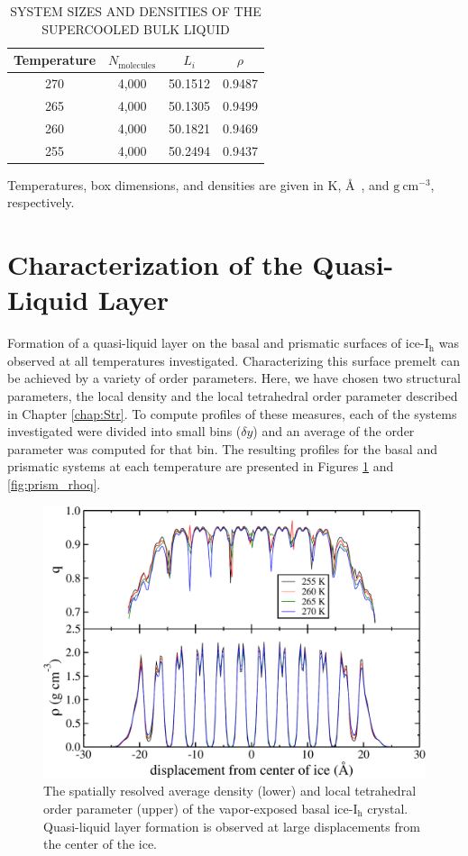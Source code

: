 \begin{table}[h] \centering \caption{SYSTEM SIZES AND DENSITIES OF THE SUPERCOOLED BULK LIQUID\label{tab:qll-liquid}}
\begin{tabular}{cccc}
\hline
\hline
 Temperature & $N_\mathrm{molecules}$ & $L_i$ & $\rho$\\
\hline
270 & 4,000 & 50.1512 & 0.9487 \\
265 & 4,000 & 50.1305 & 0.9499 \\
260 & 4,000 & 50.1821 & 0.9469 \\
255 & 4,000 & 50.2494 & 0.9437 \\
\hline
\hline
\end{tabular}
\begin{flushleft}
Temperatures, box dimensions, and densities are given in K, \AA~, and
$\mathrm{g}~\mathrm{cm}^{-3}$, respectively.
\end{flushleft}
\end{table}

\section{Characterization of the Quasi-Liquid Layer}
Formation of a quasi-liquid layer on the basal and prismatic surfaces
of ice-I$_\mathrm{h}$ was observed at all temperatures
investigated. Characterizing this surface premelt can be achieved by a
variety of order parameters. Here, we have chosen two structural
parameters, the local density and the local tetrahedral order
parameter described in Chapter \ref{chap:Str}. To compute profiles of
these measures, each of the systems investigated were divided into
small bins ($\delta y$) and an average of the order parameter was
computed for that bin. The resulting profiles for the basal and
prismatic systems at each temperature are presented in Figures
\ref{fig:basal_rhoq} and \ref{fig:prism_rhoq}.

\begin{figure}
\includegraphics[width=\linewidth]{Figures/basal_rhoq}
\caption{\label{fig:basal_rhoq} The spatially resolved average density
  (lower) and local tetrahedral order parameter (upper) of the
  vapor-exposed basal ice-I$_\mathrm{h}$ crystal. Quasi-liquid layer
  formation is observed at large displacements from the center of the
  ice.}
\end{figure}                


